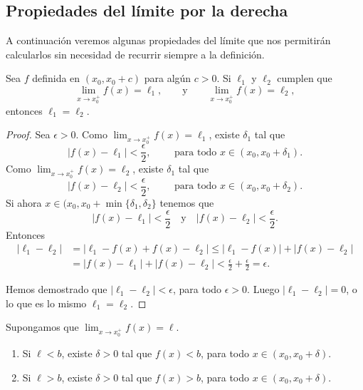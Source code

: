 \subsection{Propiedades del límite por la derecha}


A continuación veremos algunas propiedades del límite que nos permitirán calcularlos sin necesidad de recurrir siempre a la definición.

\begin{proposition}
    Sea $f$ definida en $(x_0,x_0+c)$ para algún $c>0$. Si $\ell_1$ y $\ell_2$ cumplen que
    \[
    \lim_{x\to x_0^+} f(x)=\ell_1, 
    \qquad \text{y}\qquad 
    \lim_{x\to x_0^+} f(x)=\ell_2,
    \]
    entonces $\ell_1=\ell_2$.
\end{proposition}

\begin{proof}
Sea $\epsilon>0$. 
Como $\lim_{x\to x_0^+} f(x)=\ell_1$, existe $\delta_1$ tal que
\[
|f(x)-\ell_1| < \frac{\epsilon}2, \qquad\text{ para todo $x\in(x_0,x_0+\delta_1)$}.
\]
Como $\lim_{x\to x_0^+} f(x)=\ell_2$, existe $\delta_1$ tal que
\[
|f(x)-\ell_2| < \frac{\epsilon}2, \qquad\text{ para todo $x\in(x_0,x_0+\delta_2)$}.
\]
Si ahora $x\in(x_0,x_0+\min\{\delta_1,\delta_2\}$ tenemos que 
\[
|f(x)-\ell_1| < \frac{\epsilon}2
\quad\text{y}\quad
|f(x)-\ell_2| < \frac{\epsilon}2.
\]
Entonces
\begin{align*}
|\ell_1-\ell_2|&=|\ell_1-f(x)+f(x)-\ell_2|
\le |\ell_1-f(x)|+|f(x)-\ell_2|
\\
&= |f(x)-\ell_1|+|f(x)-\ell_2|
< \frac\epsilon2+\frac\epsilon2=\epsilon.
\end{align*}

Hemos demostrado que $|\ell_1-\ell_2|<\epsilon$, para todo $\epsilon>0$.
Luego $|\ell_1-\ell_2|=0$, o lo que es lo mismo $\ell_1=\ell_2$.
\end{proof}

\begin{proposition}\label{P:limite implica valores acotados}
    Supongamos que $\lim_{x\to x_0^+} f(x)=\ell$.
    \begin{enumerate}
        \item Si $\ell<b$, existe $\delta>0$ tal que $f(x)<b$, para todo $x\in(x_0,x_0+\delta)$.
        \item Si $\ell>b$, existe $\delta>0$ tal que $f(x)>b$, para todo $x\in(x_0,x_0+\delta)$.
    \end{enumerate}
\end{proposition}

